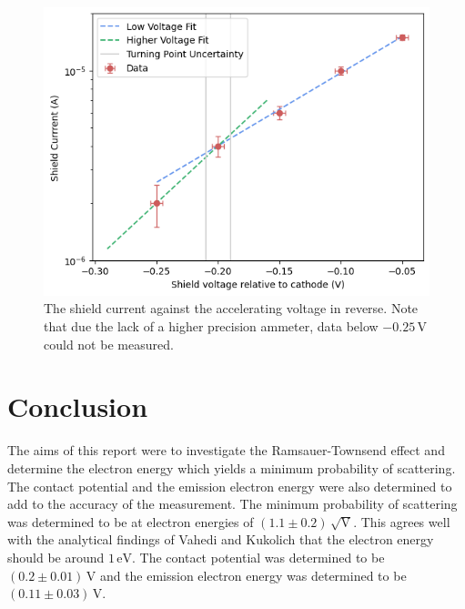 \documentclass[%
reprint,
amsmath,amssymb,
aps,
floatfix
]{revtex4-2}
\begin{document}
	\begin{figure}
		\includegraphics[width=\columnwidth]{kneeGraph.png}
		\caption{\label{fig:kneeGraph}The shield current against the accelerating voltage in reverse. Note that due the lack of a higher precision ammeter, data below $-0.25 \,\text{V}$ could not be measured.}
	\end{figure}
	
	\section{Conclusion}
	The aims of this report were to investigate the Ramsauer-Townsend effect and determine the electron energy which yields a minimum probability of scattering. The contact potential and the emission electron energy were also determined to add to the accuracy of the measurement. The minimum probability of scattering was determined to be at electron energies of $(1.1 \pm 0.2) \,\sqrt{\text{V}}$. This agrees well with the analytical findings of Vahedi \cite{vahedi} and Kukolich \citep{kukolich} that the electron energy should be around $1 \,\text{eV}$. The contact potential was determined to be $(0.2 \pm 0.01) \,\text{V}$ and the emission electron energy was determined to be $(0.11 \pm 0.03) \,\text{V}$.
		
		
	\clearpage
	
	\clearpage
	\onecolumngrid
	\appendix
	
\end{document}
